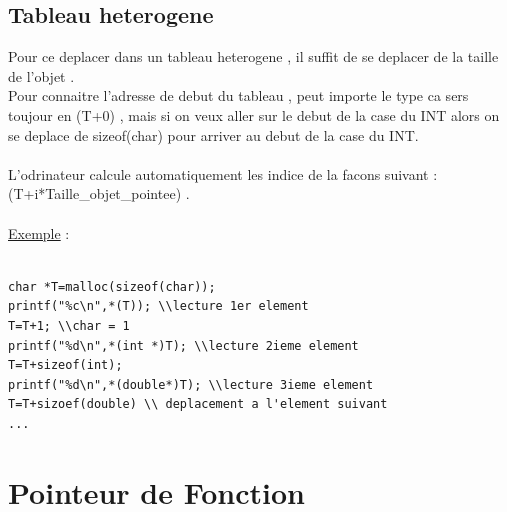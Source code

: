 \documentclass[a4paper,12pt,openany]{book}
\begin{document}
\subsection{Tableau heterogene}
Pour ce deplacer dans un tableau heterogene , il suffit de se deplacer de la taille de l'objet .\\
Pour connaitre l'adresse de debut du tableau , peut importe le type ca sers toujour en (T+0) , mais si on veux aller sur le debut de la case du INT alors on se deplace de sizeof(char) pour arriver au debut de la case du INT.\\
\\
L'odrinateur calcule automatiquement les indice de la facons suivant : (T+i*Taille\_objet\_pointee) .\\
\\
\underline{Exemple} : \\
\\
\begin{verbatim}
char *T=malloc(sizeof(char));
printf("%c\n",*(T)); \\lecture 1er element
T=T+1; \\char = 1
printf("%d\n",*(int *)T); \\lecture 2ieme element
T=T+sizeof(int);
printf("%d\n",*(double*)T); \\lecture 3ieme element
T=T+sizoef(double) \\ deplacement a l'element suivant
...
\end{verbatim}










\section{Pointeur de Fonction}
\end{document}
